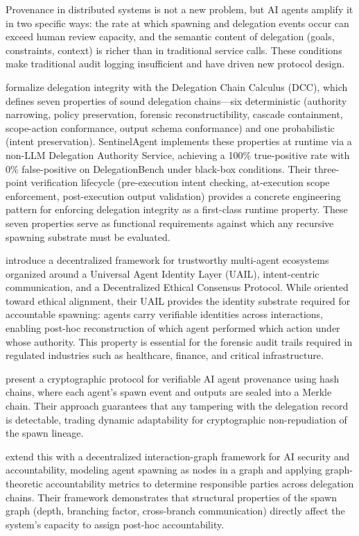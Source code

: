 Provenance in distributed systems is not a new problem, but AI agents amplify it in two specific ways: the rate at which spawning and delegation events occur can exceed human review capacity, and the semantic content of delegation (goals, constraints, context) is richer than in traditional service calls. These conditions make traditional audit logging insufficient and have driven new protocol design.

 formalize delegation integrity with the Delegation Chain Calculus (DCC), which defines seven properties of sound delegation chains---six deterministic (authority narrowing, policy preservation, forensic reconstructibility, cascade containment, scope-action conformance, output schema conformance) and one probabilistic (intent preservation). SentinelAgent implements these properties at runtime via a non-LLM Delegation Authority Service, achieving a 100\% true-positive rate with 0\% false-positive on DelegationBench under black-box conditions. Their three-point verification lifecycle (pre-execution intent checking, at-execution scope enforcement, post-execution output validation) provides a concrete engineering pattern for enforcing delegation integrity as a first-class runtime property. These seven properties serve as functional requirements against which any recursive spawning substrate must be evaluated.

 introduce a decentralized framework for trustworthy multi-agent ecosystems organized around a Universal Agent Identity Layer (UAIL), intent-centric communication, and a Decentralized Ethical Consensus Protocol. While oriented toward ethical alignment, their UAIL provides the identity substrate required for accountable spawning: agents carry verifiable identities across interactions, enabling post-hoc reconstruction of which agent performed which action under whose authority. This property is essential for the forensic audit trails required in regulated industries such as healthcare, finance, and critical infrastructure.

 present a cryptographic protocol for verifiable AI agent provenance using hash chains, where each agent's spawn event and outputs are sealed into a Merkle chain. Their approach guarantees that any tampering with the delegation record is detectable, trading dynamic adaptability for cryptographic non-repudiation of the spawn lineage.

 extend this with a decentralized interaction-graph framework for AI security and accountability, modeling agent spawning as nodes in a graph and applying graph-theoretic accountability metrics to determine responsible parties across delegation chains. Their framework demonstrates that structural properties of the spawn graph (depth, branching factor, cross-branch communication) directly affect the system's capacity to assign post-hoc accountability.

